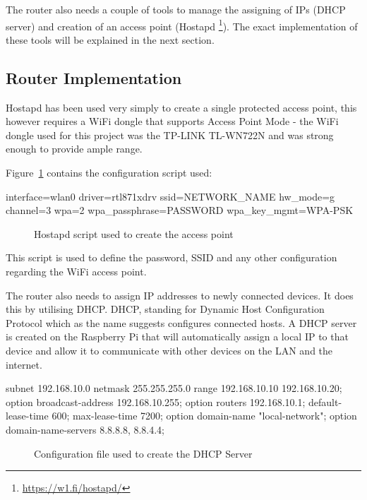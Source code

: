 The router also needs a couple of tools to manage the assigning of IPs (DHCP server) and creation of an access point (Hostapd \footnote{\url{https://w1.fi/hostapd/}}). The exact implementation of these tools will be explained in the next section.


\subsection{Router Implementation}
Hostapd has been used very simply to create a single protected access point, this however requires a WiFi dongle that supports Access Point Mode - the WiFi dongle used for this project was the TP-LINK TL-WN722N and was strong enough to provide ample range.

Figure~\ref{ref:Hostapd} contains the configuration script used:

\begin{center}
\begin{Scripts}{}
interface=wlan0
driver=rtl871xdrv
ssid=NETWORK_NAME
hw_mode=g
channel=3
wpa=2
wpa_passphrase=PASSWORD
wpa_key_mgmt=WPA-PSK
\end{Scripts}
	\begin{figure}[h]
		\caption{Hostapd script used to create the access point}
		\label{ref:Hostapd}
	\end{figure}
\end{center}

This script is used to define the password, SSID and any other configuration regarding the WiFi access point.

The router also needs to assign IP addresses to newly connected devices. It does this by utilising DHCP. DHCP, standing for Dynamic Host Configuration Protocol which as the name suggests configures connected hosts. A DHCP server is created on the Raspberry Pi that will automatically assign a local IP to that device and allow it to communicate with other devices on the LAN and the internet.

\clearpage
\begin{center}
\begin{Scripts}{}
subnet 192.168.10.0 netmask 255.255.255.0 {
	range 192.168.10.10 192.168.10.20;
 	option broadcast-address 192.168.10.255;
 	option routers 192.168.10.1;
 	default-lease-time 600;
 	max-lease-time 7200;
 	option domain-name "local-network";
 	option domain-name-servers 8.8.8.8, 8.8.4.4;
}
\end{Scripts}
\begin{figure}[h]
	\caption{Configuration file used to create the DHCP Server}
	\label{ref:dhcp-server}
\end{figure}
\end{center}

